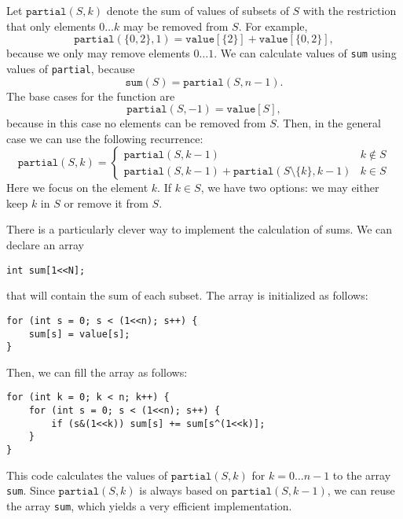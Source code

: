Let $\texttt{partial}(S,k)$ denote the sum of
values of subsets of $S$ with the restriction
that only elements $0 \ldots k$
may be removed from $S$.
For example,
\[\texttt{partial}(\{0,2\},1)=\texttt{value}[\{2\}]+\texttt{value}[\{0,2\}],\]
because we only may remove elements $0 \ldots 1$.
We can calculate values of \texttt{sum} using
values of \texttt{partial}, because
\[\texttt{sum}(S) = \texttt{partial}(S,n-1).\]
The base cases for the function are
\[\texttt{partial}(S,-1)=\texttt{value}[S],\]
because in this case no elements can be removed from $S$.
Then, in the general case we can use the following recurrence:
\begin{equation*}
    \texttt{partial}(S,k) = \begin{cases}
               \texttt{partial}(S,k-1) & k \notin S \\
               \texttt{partial}(S,k-1) + \texttt{partial}(S \setminus \{k\},k-1) & k \in S
           \end{cases}
\end{equation*}
Here we focus on the element $k$.
If $k \in S$, we have two options: we may either keep $k$ in $S$
or remove it from $S$.

There is a particularly clever way to implement the
calculation of sums. We can declare an array
\begin{lstlisting}
int sum[1<<N];
\end{lstlisting}
that will contain the sum of each subset.
The array is initialized as follows:
\begin{lstlisting}
for (int s = 0; s < (1<<n); s++) {
    sum[s] = value[s];
}
\end{lstlisting}
Then, we can fill the array as follows:
\begin{lstlisting}
for (int k = 0; k < n; k++) {
    for (int s = 0; s < (1<<n); s++) {
        if (s&(1<<k)) sum[s] += sum[s^(1<<k)];
    }
}
\end{lstlisting}
This code calculates the values of $\texttt{partial}(S,k)$
for $k=0 \ldots n-1$ to the array \texttt{sum}.
Since $\texttt{partial}(S,k)$ is always based on
$\texttt{partial}(S,k-1)$, we can reuse the array
\texttt{sum}, which yields a very efficient implementation.